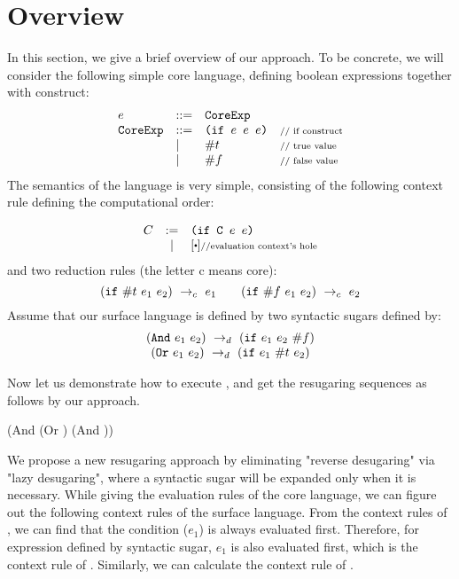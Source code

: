 \section{Overview}
\label{sec2}


In this section, we give a brief overview of our approach. To be concrete, we will consider the following simple core language, defining boolean expressions together with  construct:
\[
\begin{array}{lllll}
e &::=& \mbox{\tt CoreExp}\\
\mbox{\tt CoreExp} &::=& \texttt{(if~$e$~$e$~$e$)} &\mbox{{\scriptsize // if construct}}\\
& |& \#t  & \mbox{{\scriptsize // true value}}\\
& |& \#f & \mbox{{\scriptsize // false value}}
\end{array}
\]
The semantics of the language is very simple, consisting of the following context rule defining the computational order:

\[
\begin{array}{lcl}
C &:=& \Code{(if C $e$ $e$)}\\
&|&[\bigcdot]\note{//evaluation context's hole}\\
\end{array}
\]
and two reduction rules (the letter c means core):
\[
\centering
 \redc{(\m{if}~\true~e_1~e_2)}{e_1}  \qquad \redc{(\m{if}~\false~e_1~e_2)}{e_2} 
\]
Assume that our surface language is defined by two syntactic sugars defined by:
\[
\begin{array}{c}
(\mbox{\tt And}~e_1~e_2) ~\rightarrow_d~ (\mbox{\tt if}~e_1~e_2~\#f)\\
(\mbox{\tt Or}~e_1~e_2) ~\rightarrow_d~ (\mbox{\tt if}~e_1~\#t~e_2)
\end{array}
\]


Now let us demonstrate how to execute , and get the resugaring sequences as follows by our approach.

{\footnotesize
\begin{Codes}
    (And (Or \true \false) (And \false \true))
\end{Codes}
}


We propose a new resugaring approach by eliminating "reverse desugaring" via "lazy desugaring", where a syntactic sugar will be expanded only when it is necessary. While giving the evaluation rules of the core language, we can figure out the following context rules of the surface language. From the context rules of , we can find that the condition ($e_1$) is always evaluated first. Therefore, for expression  defined by syntactic sugar, $e_1$ is also evaluated first, which is the context rule of . Similarly, we can calculate the context rule of .


